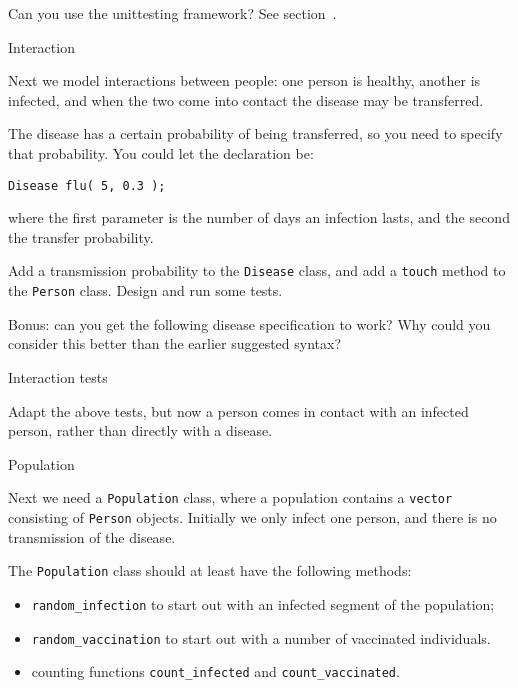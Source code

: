 Can you use the  unittesting framework?
See section~.

 {Interaction}

Next we model interactions between people:
one person is healthy, another is infected,
and when the two come into contact
the disease may be transferred.

The disease has a certain probability of being transferred,
so you need to specify that probability.
You could let the declaration be:
\begin{lstlisting}
Disease flu( 5, 0.3 );
\end{lstlisting}
where the first parameter is the number of days an infection lasts,
and the second the transfer probability.

\begin{exercise}
  Add a transmission probability to the \lstinline{Disease} class,
  and add a \lstinline{touch} method to the \lstinline{Person} class.
  Design and run some tests.
\end{exercise}

\begin{exercise}
  Bonus: can you get the following disease specification to work?
  Why could you consider this better than the earlier suggested syntax?
\end{exercise}

 {Interaction tests}

Adapt the above tests,
but now a person comes in contact with an infected person,
rather than directly with a disease.

 {Population}

Next we need a \lstinline{Population} class,
where a population contains a \lstinline{vector}
consisting of \lstinline{Person} objects.
Initially we only infect one person, and there
is no transmission of the disease.

The \lstinline{Population} class should at least have the following methods:
\begin{itemize}
\item \lstinline{random_infection} to start out with an infected segment
  of the population;
\item \lstinline{random_vaccination} to start out with a number of
  vaccinated individuals.
\item counting functions \lstinline{count_infected} and \lstinline{count_vaccinated}.
\end{itemize}

